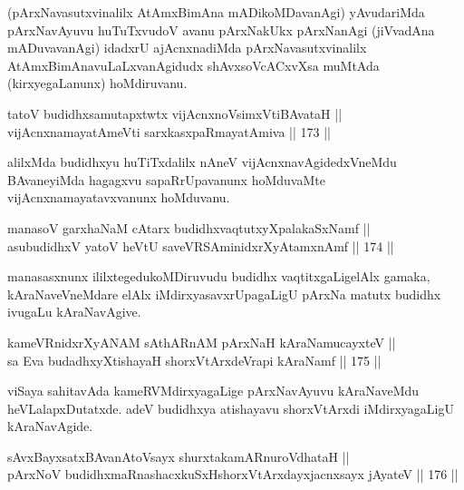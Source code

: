 \begin{artha}
(pArxNavasutxvinalilx AtAmxBimAna mADikoMDavanAgi) yAvudariMda
pArxNavAyuvu huTuTxvudoV avanu pArxNakUkx pArxNanAgi (jiVvadAna
mADuvavanAgi) idadxrU ajAcnxnadiMda pArxNavasutxvinalilx
AtAmxBimAnavuLaLxvanAgidudx shAvxsoVcACxvXsa muMtAda
(kirxyegaLanunx) hoMdiruvanu.
\end{artha}


\begin{shl}
tatoV budidhxsamutapxtwtx vijAcnxnoV\s simxVtiBAvataH || \\
vijAcnxnamayatAmeVti sarxkasxpaRmayatAmiva \hfill || 173 ||  
\end{shl}

\begin{artha}
alilxMda budidhxyu huTiTxdalilx nAneV vijAcnxnavAgidedxVneMdu
BAvaneyiMda hagagxvu sapaRrUpavanunx hoMduvaMte
vijAcnxnamayatavxvanunx hoMduvanu.
\end{artha}

\begin{shl}
manasoV garxhaNaM cAtarx budidhxvaqtutxyXpalakaSxNamf || \\
asubudidhxV yatoV heVtU saveVRSAminidxrXyAtamxnAmf \hfill || 174 ||  
\end{shl}

\begin{artha}
manasasxnunx ililxtegedukoMDiruvudu budidhx vaqtitxgaLigelAlx gamaka,
kAraNaveVneMdare elAlx iMdirxyasavxrUpagaLigU pArxNa matutx budidhx
ivugaLu kAraNavAgive.
\end{artha}

\begin{shl}
kameVRnidxrXyANAM sAthARnAM pArxNaH kAraNamucayxteV || \\
sa Eva budadhxyXtishayaH shorxVtArxdeVrapi kAraNamf \hfill || 175 ||  
\end{shl}

\begin{artha}
viSaya sahitavAda kameRVMdirxyagaLige pArxNavAyuvu
kAraNaveMdu heVLalapxDutatxde. adeV budidhxya atishayavu shorxVtArxdi
iMdirxyagaLigU kAraNavAgide.
\end{artha}


\begin{shl}
sAvxBayxsatxBAvanAtoV\s sayx shurxtakamARnuroVdhataH || \\
pArxNoV budidhxmaRnashacxkuSxHshorxVtArxdayxjacnxsayx jAyateV \hfill || 176 || 
\end{shl}

